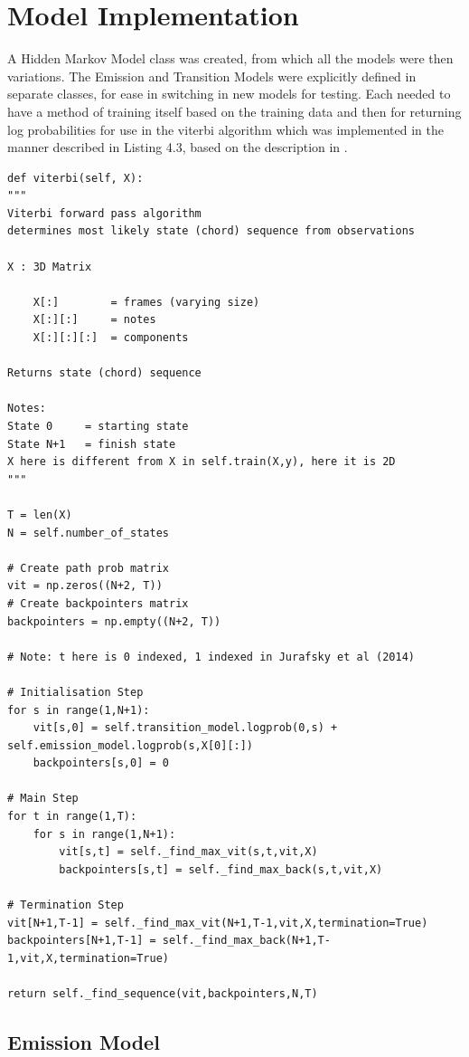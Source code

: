 \documentclass[bsc,singlespacing,parskip,deptreport,twoside,frontabs]{infthesis}
\begin{document}
\section{Model Implementation}

A Hidden Markov Model class was created, from which all the models were then variations. The Emission and Transition Models were explicitly defined in separate classes, for ease in switching in new models for testing. Each needed to have a method of training itself based on the training data and then for returning log probabilities for use in the viterbi algorithm which was implemented in the manner described in Listing 4.3, based on the description in \cite{jur}.
\begin{lstlisting}[frame=single,caption='Viterbi Algorithm']
def viterbi(self, X):
"""
Viterbi forward pass algorithm
determines most likely state (chord) sequence from observations

X :	3D Matrix

	X[:] 		= frames (varying size)
	X[:][:]		= notes
	X[:][:][:]	= components

Returns state (chord) sequence

Notes:
State 0 	= starting state
State N+1	= finish state
X here is different from X in self.train(X,y), here it is 2D
"""

T = len(X)
N = self.number_of_states

# Create path prob matrix
vit = np.zeros((N+2, T))
# Create backpointers matrix
backpointers = np.empty((N+2, T))

# Note: t here is 0 indexed, 1 indexed in Jurafsky et al (2014)

# Initialisation Step
for s in range(1,N+1):
	vit[s,0] = self.transition_model.logprob(0,s) + self.emission_model.logprob(s,X[0][:])
	backpointers[s,0] = 0

# Main Step
for t in range(1,T):
	for s in range(1,N+1):
		vit[s,t] = self._find_max_vit(s,t,vit,X)
		backpointers[s,t] = self._find_max_back(s,t,vit,X)

# Termination Step
vit[N+1,T-1] = self._find_max_vit(N+1,T-1,vit,X,termination=True)
backpointers[N+1,T-1] = self._find_max_back(N+1,T-1,vit,X,termination=True)

return self._find_sequence(vit,backpointers,N,T)
\end{lstlisting}

\subsection{Emission Model}
\end{document}
